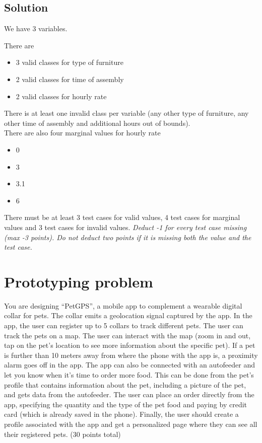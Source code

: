 \documentclass[12pt]{book}
\begin{document}
\section*{Solution}

We have 3 variables. 


There are \begin{itemize}
    \item 3 valid classes for type of furniture
    \item 2 valid classes for time of assembly
    \item 2 valid classes for hourly rate
\end{itemize}

There is at least one invalid class per variable (any other type of furniture, any other time of assembly and additional hours out of bounds). \\There are also four marginal values for hourly rate

\begin{itemize}
    \item 0
    \item 3
    \item 3.1
    \item 6
\end{itemize}

There must be at least 3 test cases for valid values, 4 test cases for marginal values and 3 test cases for invalid values. \textit{Deduct -1 for every test case missing (max -3 points). Do not deduct two points if it is missing both the value and the test case.}

\chapter{Prototyping problem}
You are designing “PetGPS”, a mobile app to complement a wearable digital collar for pets. The collar emits a geolocation signal captured by the app.
In the app, the user can register up to 5 collars to track different pets. The user can track the pets on a map. The user can interact with the map (zoom in and out, tap on the pet's location to see more information about the specific pet). If a pet is further than 10 meters away from where the phone with the app is, a proximity alarm goes off in the app. The app can also be connected with an autofeeder and let you know when it's time to order more food. This can be done from the pet's profile that contains information about the pet, including a picture of the pet, and gets data from the autofeeder. The user can place an order directly from the app, specifying the quantity and the type of the pet food and paying by credit card (which is already saved in the phone). Finally, the user should create a profile associated with the app and get a personalized page where they can see all their registered pets.  (30 points total)\\
\end{document}

